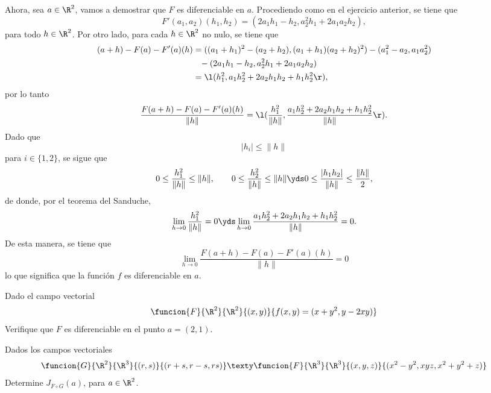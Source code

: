 \documentclass[a4,11pt]{aleph-examen}
\begin{document}
\begin{preguntas}
\begin{respuesta}
\begin{respuesta}
\begin{respuesta}
    Ahora, sea $a\in\R^2$, vamos a demostrar que $F$ es diferenciable en $a$. Procediendo como en el ejercicio anterior, se tiene que
    \[
        F'(a_1,a_2)(h_1,h_2)=(2a_1h_1-h_2, a_2^2h_1+2a_1a_2h_2),
    \]
    para todo $h\in\R^2$. Por otro lado, para cada $h\in\R^2$ no nulo, se tiene que
	\begin{align*}
		(a+h)-F(a)-F'(a)(h)
			&=((a_1+h_1)^2-(a_2+h_2),(a_1+h_1)(a_2+h_2)^2)
			-(a_1^2-a_2,a_1 a_2^2) \\
			&\phantom{=}-(2a_1h_1-h_2, a_2^2h_1+2a_1a_2h_2) \\
			&=\l(h_1^2, a_1h_2^2+2a_2h_1h_2+h_1h_2^2\r),
	\end{align*}
	por lo tanto
	\[
	    \frac{F(a+h)-F(a)-F'(a)(h)}{\|h\|}=\l(\frac{h_1^2}{\|h\|},\frac{a_1h_2^2+2a_2h_1h_2+h_1h_2^2}{\|h\|}\r).
	\]
	Dado que
	\[
		|h_i|\leq \|h\|
	\]
	para $i\in\{1, 2\}$, se sigue que
	\[
		0\leq \dfrac{h_1^2}{\|h\|}\leq \|h\|, 
		\qquad
		0\leq \dfrac{h_2^2}{\|h\|}\leq \|h\|
		\yds
		0\leq \dfrac{|h_1h_2|}{\|h\|}\leq \frac{\|h\|}{2}, 
	\]
	de donde, por el teorema del Sanduche, 
	\[
		\lim_{h\to 0}\dfrac{h_1^2}{\|h\|}=0
		\yds
		\lim_{h\to 0}\dfrac{a_1h_2^2+2 a_2h_1h_2+h_1h_2^2}{\|h\|}=0.
	\]
	De esta manera, se tiene que
	\[
		\lim_{h\to 0}\dfrac{F(a+h)-F(a)-F'(a)(h)}{\|h\|}=0
	\]
	lo que significa que la función $f$ es diferenciable en $a$.
\end{respuesta}

\item
    Dado el campo vectorial
    \[
        \funcion{F}{\R^2}{\R^2}{(x,y)}{f(x,y)=(x+y^2,y-2xy)}
    \]
    Verifique que $F$ es diferenciable en el punto $a=(2,1)$.

\item
	Dados los campos vectoriales
	\[
 	    \funcion{G}{\R^2}{\R^3}{(r,s)}{(r+s,r-s,rs)}
 	    \texty
 	    \funcion{F}{\R^3}{\R^3}{(x,y,z)}{(x^2-y^2,xyz,x^2+y^2+z)}
	\]
	Determine $J_{F\circ G}(a)$, para $a\in\R^2$.
	

\end{respuesta}
\end{respuesta}
\end{preguntas}
\end{document}
